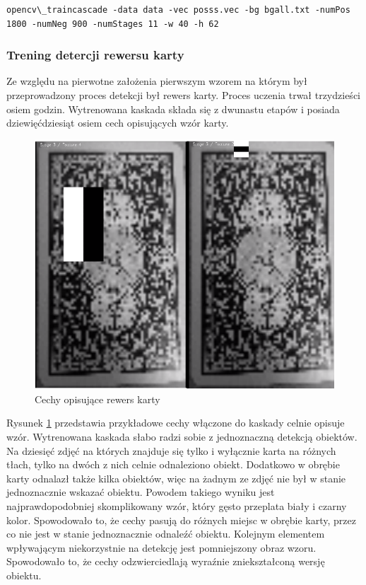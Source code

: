 \begin{lstlisting}
opencv\_traincascade -data data -vec posss.vec -bg bgall.txt -numPos 1800 -numNeg 900 -numStages 11 -w 40 -h 62
\end{lstlisting}

\subsubsection{Trening detercji rewersu karty}

Ze względu na pierwotne założenia pierwszym wzorem na którym był przeprowadzony proces detekcji był rewers karty. Proces uczenia trwał trzydzieści osiem godzin. Wytrenowana kaskada składa się z dwunastu etapów i posiada dziewięćdziesiąt osiem cech opisujących wzór karty.

\begin{figure}[H]
	\centering
	\includegraphics[scale=0.2]{imgs/cechyRewers.png}
	\caption{Cechy opisujące rewers karty}
	\label{fig:cechyRewers}
\end{figure}

Rysunek \ref{fig:cechyRewers} przedstawia przykładowe cechy włączone do kaskady celnie opisuje wzór. Wytrenowana kaskada słabo radzi sobie z jednoznaczną detekcją obiektów. Na dziesięć zdjęć na których znajduje się tylko i wyłącznie karta na różnych tłach, tylko na dwóch z nich celnie odnaleziono obiekt. Dodatkowo w obrębie karty odnalazł także kilka obiektów, więc na żadnym ze zdjęć nie był w stanie jednoznacznie wskazać obiektu. Powodem takiego wyniku jest najprawdopodobniej skomplikowany wzór, który gęsto przeplata biały i czarny kolor. Spowodowało to, że cechy pasują do różnych miejsc w obrębie karty, przez co nie jest w stanie jednoznacznie odnaleźć obiektu. Kolejnym elementem wpływającym niekorzystnie na detekcję jest pomniejszony obraz wzoru. Spowodowało to, że cechy odzwierciedlają wyraźnie zniekształconą wersję obiektu.

